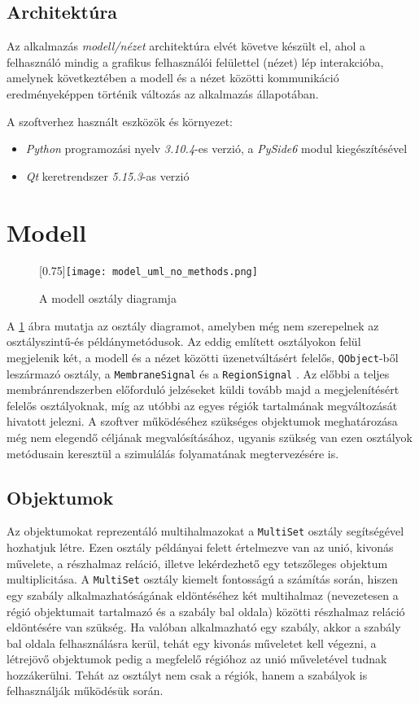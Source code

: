 \subsection{Architektúra}
Az alkalmazás \textit{modell/nézet} architektúra elvét követve készült el, ahol a felhasználó mindig a grafikus felhasználói felülettel (nézet) lép interakcióba, amelynek következtében a modell és a nézet közötti kommunikáció eredményeképpen történik változás az alkalmazás állapotában.

A szoftverhez használt eszközök és környezet:
\begin{itemize}
\item \textit{Python} programozási nyelv \textit{3.10.4}-es verzió, a \textit{PySide6} modul kiegészítésével
\item \textit{Qt} keretrendszer \textit{5.15.3}-as verzió
\end{itemize}

\section{Modell}

\begin{figure}[H]
\advance\leftskip-3cm
	\scalebox{0.75}[0.75]{\texttt{[image: model\_uml\_no\_methods.png]}}
	\caption{A modell osztály diagramja}
	\label{fig:model_no_methods}
\end{figure}

A \ref{fig:model_no_methods} ábra mutatja az osztály diagramot, amelyben még nem szerepelnek az osztályszintű-és példánymetódusok. Az eddig említett osztályokon felül megjelenik két, a modell és a nézet közötti üzenetváltásért felelős, \verb|QObject|-ből leszármazó osztály, a \verb|MembraneSignal| és a \verb|RegionSignal| . Az előbbi a teljes membránrendszerben előforduló jelzéseket küldi tovább majd a megjelenítésért felelős osztályoknak, míg az utóbbi az egyes régiók tartalmának megváltozását hivatott jelezni. A szoftver működéséhez szükséges objektumok meghatározása még nem elegendő céljának megvalósításához, ugyanis szükség van ezen osztályok metódusain keresztül a szimulálás folyamatának megtervezésére is.

\subsection{Objektumok}

Az objektumokat reprezentáló multihalmazokat a \verb|MultiSet| osztály segítségével hozhatjuk létre. Ezen osztály példányai felett értelmezve van az unió, kivonás művelete, a részhalmaz reláció, illetve lekérdezhető egy tetszőleges objektum multiplicitása. A \verb|MultiSet| osztály kiemelt fontosságú a számítás során, hiszen egy szabály alkalmazhatóságának eldöntéséhez két multihalmaz (nevezetesen a régió objektumait tartalmazó és a szabály bal oldala) közötti részhalmaz reláció eldöntésére van szükség. Ha valóban alkalmazható egy szabály, akkor a szabály bal oldala felhasználásra kerül, tehát egy kivonás műveletet kell végezni, a létrejövő objektumok pedig a megfelelő régióhoz az unió műveletével tudnak hozzákerülni. Tehát az osztályt nem csak a régiók, hanem a szabályok is felhasználják működésük során.


